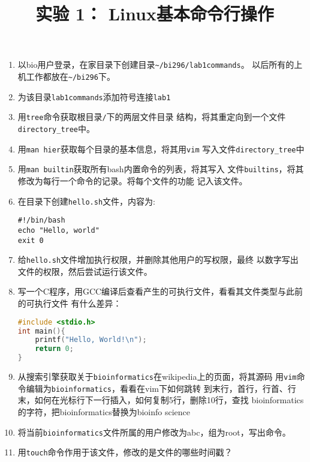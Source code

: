 \documentclass[12pt]{article}
\begin{document}
\begin{CJK*}{UTF8}{gbsn}

\title{实验 1： Linux基本命令行操作}
\author{}
\date{}

\maketitle


\begin{enumerate}[(1)]
	\item 以bio用户登录，在家目录下创建目录\lstinline{~/bi296/lab1commands}。
		以后所有的上机工作都放在\lstinline{~/bi296}下。
	\item 为该目录\lstinline{lab1commands}添加符号连接\lstinline{lab1}
	\item 用\lstinline{tree}命令获取根目录\lstinline{/}下的两层文件目录
		结构，将其重定向到一个文件\lstinline{directory_tree}中。
	\item 用\lstinline{man hier}获取每个目录的基本信息，将其用\lstinline{vim}
		写入文件\lstinline{directory_tree}中
	\item 用\lstinline{man builtin}获取所有bash内置命令的列表，将其写入
		文件\lstinline{builtins}，将其修改为每行一个命令的记录。将每个文件的功能
		记入该文件。
	\item 在目录下创建\lstinline{hello.sh}文件，内容为:  
	\begin{lstlisting}
#!/bin/bash
echo "Hello, world"
exit 0
	\end{lstlisting}
	\item 给\lstinline{hello.sh}文件增加执行权限，并删除其他用户的写权限，最终
		以数字写出文件的权限，然后尝试运行该文件。
	\item 写一个C程序，用GCC编译后查看产生的可执行文件，看看其文件类型与此前的可执行文件
		有什么差异：
	\begin{lstlisting}[language=c]
#include <stdio.h>
int main(){
	printf("Hello, World!\n");
	return 0;
}
	\end{lstlisting}
	\item 从搜索引擎获取关于\texttt{bioinformatics}在wikipedia上的页面，将其源码
		用\lstinline{vim}命令编辑为\lstinline{bioinformatics}，看看在vim下如何跳转
		到末行，首行，行首、行末，如何在光标行下一行插入，如何复制5行，删除10行，查找
		bioinformatics的字符，把bioinformatics替换为bioinfo science
	\item 将当前\lstinline{bioinformatics}文件所属的用户修改为abc，组为root，写出命令。
	\item 用\lstinline{touch}命令作用于该文件，修改的是文件的哪些时间戳？

\end{enumerate}
\end{CJK*}
\end{document}
